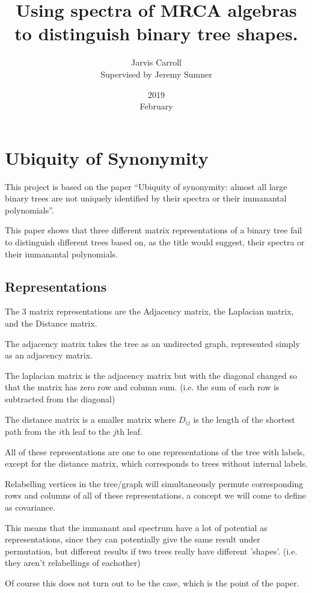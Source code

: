 \documentclass[10pt,a4paper]{report}
\title{Using spectra of MRCA algebras to distinguish binary tree shapes.}
\date{2019\\ February}
\author{Jarvis Carroll
\\ Supervised by Jeremy Sumner}
\begin{document}
\maketitle

\chapter{Ubiquity of Synonymity}

This project is based on the paper ``Ubiquity of synonymity: almost all large
binary trees are not uniquely identified by their spectra or their immanantal
polynomials''.

This paper shows that three different matrix representations of a binary tree
fail to distinguish different trees based on, as the title would suggest, their
spectra or their immanantal polynomials.

\section{Representations}

The 3 matrix representations are the Adjacency matrix, the Laplacian matrix,
and the Distance matrix.

The adjacency matrix takes the tree as an undirected graph, represented simply
as an adjacency matrix.

The laplacian matrix is the adjacency matrix but with the diagonal changed so
that the matrix has zero row and column sum. (i.e. the sum of each row is
subtracted from the diagonal)

The distance matrix is a smaller matrix where $D_{ij}$ is the length of the
shortest path from the $i$th leaf to the $j$th leaf.

All of these representations are one to one representations of the tree with
labels, except for the distance matrix, which corresponds to trees without
internal labels.

Relabelling vertices in the tree/graph will simultaneously permute
corresponding rows and columns of all of these representations, a concept we
will come to define as covariance.

This means that the immanant and spectrum have a lot of potential as
representations, since they can potentially give the same result under
permutation, but different results if two trees really have different 'shapes'.
(i.e. they aren't relabellings of eachother)

Of course this does not turn out to be the case, which is the point of the
paper.
\end{document}
